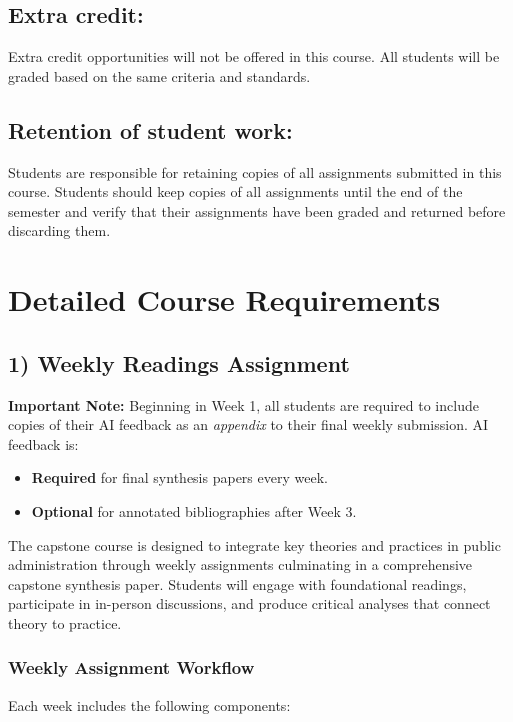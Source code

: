 \documentclass[12pt]{article}     %
\begin{document}
	\subsection*{Extra credit:}
		Extra credit opportunities will not be offered in this course. All students will be graded based on the same criteria and standards.

	\subsection*{Retention of student work:}
		Students are responsible for retaining copies of all assignments submitted in this course. Students should keep copies of all assignments until the end of the semester and verify that their assignments have been graded and returned before discarding them.

\section{Detailed Course Requirements}

\subsection*{1) Weekly Readings Assignment}

\textbf{Important Note:} Beginning in Week 1, all students are required to include copies of their AI feedback as an \emph{appendix} to their final weekly submission. AI feedback is:
\begin{itemize}
    \item \textbf{Required} for final synthesis papers every week.
    \item \textbf{Optional} for annotated bibliographies after Week 3.
\end{itemize}

The capstone course is designed to integrate key theories and practices in public administration through weekly assignments culminating in a comprehensive capstone synthesis paper. Students will engage with foundational readings, participate in in-person discussions, and produce critical analyses that connect theory to practice.

\subsubsection*{Weekly Assignment Workflow}

Each week includes the following components:
\end{document}
